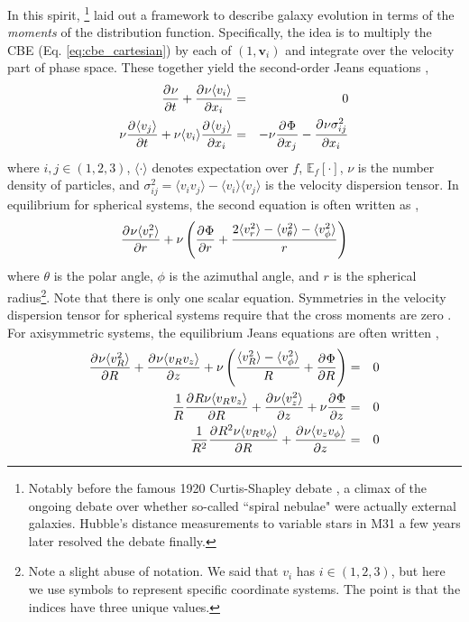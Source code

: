 In this spirit, \citet{jeans_1915}\footnote{Notably before the famous 1920 Curtis-Shapley debate \citep{curtis_shapley}, a climax of the ongoing debate over whether so-called ``spiral nebulae" were actually external galaxies. Hubble's distance measurements to variable stars in M31 a few years later resolved the debate finally.} laid out a framework to describe galaxy evolution in terms of the \textit{moments} of the distribution function. Specifically, the idea is to multiply the CBE (Eq. \eqref{eq:cbe_cartesian}) by each of $(1,\textbf{v}_i)$ and integrate over the velocity part of phase space. These together yield the second-order Jeans equations \citep{BT},
\begin{eqnarray}
\frac{\partial^{} {\nu}}{\partial {t}^{}} + \frac{\partial^{} {\nu \langle v_i \rangle}}{\partial {x_i}^{}} &=& 0 \\
\nu \frac{\partial^{} {\langle v_j \rangle}}{\partial {t}^{}} + \nu \langle v_i \rangle \frac{\partial^{} {\langle v_j \rangle}}{\partial {x_i}^{}} &=& -\nu \frac{\partial^{} {\Phi}}{\partial {x_j}^{}} - \frac{\partial^{} {\nu \sigma^2_{ij}}}{\partial {x_i}^{}}\label{eq:jeans}
\end{eqnarray}
where $i,j \in (1,2,3)$, $\langle\cdot\rangle$ denotes expectation over $f$, $\mathbb{E}_f[\cdot]$, $\nu$ is the number density of particles, and $\sigma^2_{ij} = \langle v_i v_j \rangle - \langle v_i \rangle \langle v_j \rangle$ is the velocity dispersion tensor. In equilibrium for spherical systems, the second equation is often written as \citep{BT},
\begin{equation}
\frac{\partial^{} {\nu \langle v_r^2 \rangle}}{\partial {r}^{}} + \nu \left(\frac{\partial^{} {\Phi}}{\partial {r}^{}} + \frac{2 \langle v_r^2 \rangle - \langle v_\theta^2\rangle - \langle v_\phi^2 \rangle}{r} \right)
\end{equation}
where $\theta$ is the polar angle, $\phi$ is the azimuthal angle, and $r$ is the spherical radius\footnote{Note a slight abuse of notation. We said that $v_i$ has $i \in (1,2,3)$, but here we use symbols to represent specific coordinate systems. The point is that the indices have three unique values.}. Note that there is only one scalar equation. Symmetries in the velocity dispersion tensor for spherical systems require that the cross moments are zero \citep{BT}. For axisymmetric systems, the equilibrium Jeans equations are often written \citep{BT},
\begin{eqnarray}
\frac{\partial^{} {\nu \langle v_R^2 \rangle}}{\partial {R}^{}} + \frac{\partial^{} {\nu \langle v_R v_z \rangle}}{\partial {z}^{}} + \nu \left(\frac{\langle v_R^2 \rangle - \langle v_\phi^2 \rangle}{R} + \frac{\partial^{} {\Phi}}{\partial {R}^{}} \right) &=& 0\\
\frac{1}{R} \frac{\partial^{} {R \nu \langle v_R v_z \rangle}}{\partial {R}^{}} + \frac{\partial^{} {\nu \langle v_z^2 \rangle}}{\partial {z}^{}}+ \nu \frac{\partial^{} {\Phi}}{\partial {z}^{}} &=& 0\\
\frac{1}{R^2} \frac{\partial^{} {R^2 \nu \langle v_R v_\phi \rangle}}{\partial {R}^{}} + \frac{\partial^{} {\nu \langle v_z v_\phi\rangle}}{\partial {z}^{}} &=& 0
\end{eqnarray}
